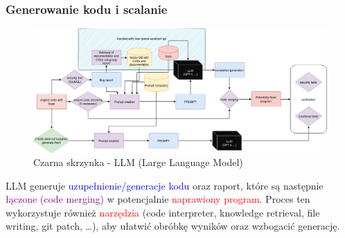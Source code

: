 \subsubsection{Generowanie kodu i scalanie}
\begin{figure}[h]
    \centering
    \includegraphics[clip, trim=12cm 6cm 6cm 0cm, width=0.9\linewidth]{img/gptester.drawio.png}
    \caption{Czarna skrzynka - LLM (Large Language Model)}
    \label{fig:przyciety_obraz-generowanie}
\end{figure}
LLM generuje \textcolor{blue}{uzupełnienie/generacje kodu} oraz raport, które są następnie \textcolor{purple}{łączone (code merging)} w potencjalnie \textcolor{red}{naprawiony program}. Proces ten wykorzystuje również \textcolor{red}{narzędzia}
(code interpreter, knowledge retrieval, file writing, git patch, \dots), aby ułatwić obróbkę wyników oraz wzbogacić generację.


